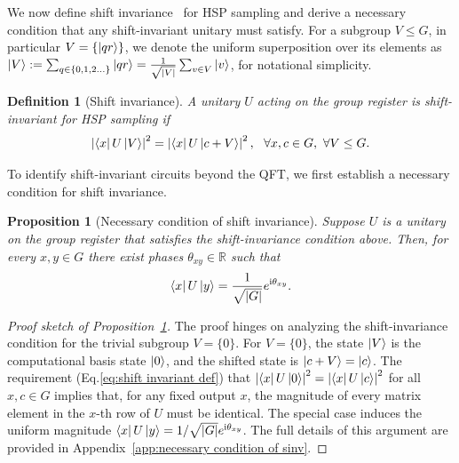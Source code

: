 \documentclass[reprint, aps, prl, superscriptaddress]{revtex4-2}
\newcommand{\ii}{\mathrm{i}}
\newtheorem{definition}{Definition}
\newtheorem{proposition}{Proposition}
\begin{document}
We now define shift invariance~\cite{NielsenChuang2000} for HSP sampling and derive a necessary condition that any shift-invariant unitary must satisfy. For a subgroup $V \le G$, in particular $V=\{\ket{qr}\}$, we denote the uniform superposition over its elements as $\ket{V} := \sum_{q\in \{0,1,2...\}} \ket{qr}  = \frac{1}{\sqrt{|V|}} \sum_{v \in V} \ket{v}$, for notational simplicity.

\begin{definition}[Shift invariance]
    A unitary $U$ acting on the group register is shift-invariant for HSP sampling if
    \begin{equation}
    \label{eq:shift invariant def}
        \left|\bra{x}U\ket{V}\right|^2
        =
        \left|\bra{x}U \ket{c+V}\right|^2,
        ~~
        \forall x,c \in G,\ \forall V \le G.
    \end{equation}
\end{definition}

To identify shift-invariant circuits beyond the QFT, we first establish a necessary condition for shift invariance.
\begin{proposition}[Necessary condition of shift invariance]
\label{thm:necessary_modulus_condition}
    Suppose $U$ is a unitary on the group register that satisfies the shift-invariance condition above. Then, for every $x,y\in G$ there exist phases $\theta_{xy}\in\mathbb{R}$ such that
    \begin{equation}
        \bra{x}U\ket{y}=\frac{1}{\sqrt{|G|}}e^{\ii\theta_{xy}}.
    \end{equation}
\end{proposition}

\begin{proof}[Proof sketch of Proposition~\ref{thm:necessary_modulus_condition}]
The proof hinges on analyzing the shift-invariance condition for the trivial subgroup $V = \{0\}$. For $V = \{0\}$, the state $\ket{V}$ is the computational basis state $\ket{0}$, and the shifted state is $\ket{c+V} = \ket{c}$. The requirement (Eq.\eqref{eq:shift invariant def}) that $\left|\bra{x}U\ket{0}\right|^2 = \left|\bra{x}U\ket{c}\right|^2$ for all $x, c \in G$ implies that, for any fixed output $x$, the magnitude of every matrix element in the $x$-th row of $U$ must be identical. The special case induces the uniform magnitude $\bra{x}U\ket{y} = 1/\sqrt{|G|} e^{\ii \theta_{xy}}$. The full details of this argument are provided in Appendix~\ref{app:necessary condition of sinv}.
\end{proof}
\end{document}
